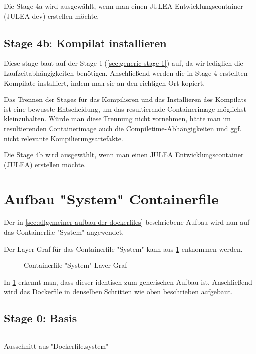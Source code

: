 Die Stage 4a wird ausgewählt, wenn man einen JULEA Entwicklungscontainer (JULEA-dev) erstellen möchte. 

\subsection{Stage 4b: Kompilat installieren} \label{sec:generic-stage-4b}

Diese stage baut auf der Stage 1 (\cref{sec:generic-stage-1}) auf, da wir lediglich die Laufzeitabhängigkeiten benötigen. Anschließend werden die in Stage 4 erstellten Kompilate installiert, indem man sie an den richtigen Ort kopiert. 

Das Trennen der Stages für das Kompilieren und das Installieren des Kompilats ist eine bewusste Entscheidung, um das resultierende Containerimage möglichst kleinzuhalten. Würde man diese Trennung nicht vornehmen, hätte man im resultierenden Containerimage auch die Compiletime-Abhängigkeiten und ggf. nicht relevante Kompilierungsartefakte. 

Die Stage 4b wird ausgewählt, wenn man einen JULEA Entwicklungscontainer (JULEA) erstellen möchte.

\section{Aufbau "System" Containerfile}

Der in \cref{sec:allgemeiner-aufbau-der-dockerfiles} beschriebene Aufbau wird nun auf das Containerfile "System" angewendet. 

Der Layer-Graf für das Containerfile "System" kann aus \cref{fig:system-layer-graph} entnommen werden.
\begin{figure}[!htbp]
    \centering
    
    \caption{Containerfile "System" Layer-Graf}
    \label{fig:system-layer-graph}
\end{figure}
\FloatBarrier

In \cref{fig:system-layer-graph} erkennt man, dass dieser identisch zum generischen Aufbau ist. Anschließend wird das Dockerfile in denselben Schritten wie oben beschrieben aufgebaut.

\subsection{Stage 0: Basis} \label{sec:system-stage-0}

\begin{listing}
    \inputminted[firstline=0,lastline=7]{dockerfile}{./code-examples/Dockerfile.system}
    \caption{Ausschnitt aus "Dockerfile.system"}
    \label{lst:system-dockerfile-0-7}
\end{listing}


